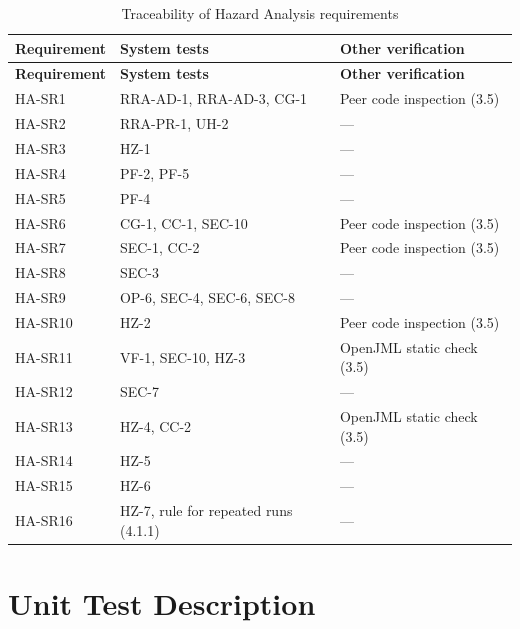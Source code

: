 \documentclass[12pt, titlepage]{article}
\begin{document}
\begin{longtable}{>{\raggedright\arraybackslash}p{}>{\raggedright\arraybackslash}p{}>{\raggedright\arraybackslash}p{}}
\caption{Traceability of Hazard Analysis requirements} \label{tab:trace-ha} \\
\toprule
\textbf{Requirement} & \textbf{System tests} & \textbf{Other verification} \\
\midrule
\endfirsthead
\toprule
\textbf{Requirement} & \textbf{System tests} & \textbf{Other verification} \\
\midrule
\endhead
\bottomrule
\endfoot
HA-SR1 & RRA-AD-1, RRA-AD-3, CG-1 & Peer code inspection (3.5) \\
HA-SR2 & RRA-PR-1, UH-2 & --- \\
HA-SR3 & HZ-1 & --- \\
HA-SR4 & PF-2, PF-5 & --- \\
HA-SR5 & PF-4 & --- \\
HA-SR6 & CG-1, CC-1, SEC-10 & Peer code inspection (3.5) \\
HA-SR7 & SEC-1, CC-2 & Peer code inspection (3.5) \\
HA-SR8 & SEC-3 & --- \\
HA-SR9 & OP-6, SEC-4, SEC-6, SEC-8 & --- \\
HA-SR10 & HZ-2 & Peer code inspection (3.5) \\
HA-SR11 & VF-1, SEC-10, HZ-3 & OpenJML static check (3.5) \\
HA-SR12 & SEC-7 & --- \\
HA-SR13 & HZ-4, CC-2 & OpenJML static check (3.5) \\
HA-SR14 & HZ-5 & --- \\
HA-SR15 & HZ-6 & --- \\
HA-SR16 & HZ-7, rule for repeated runs (4.1.1) & --- \\
\end{longtable}

\section{Unit Test Description}



\end{document}

